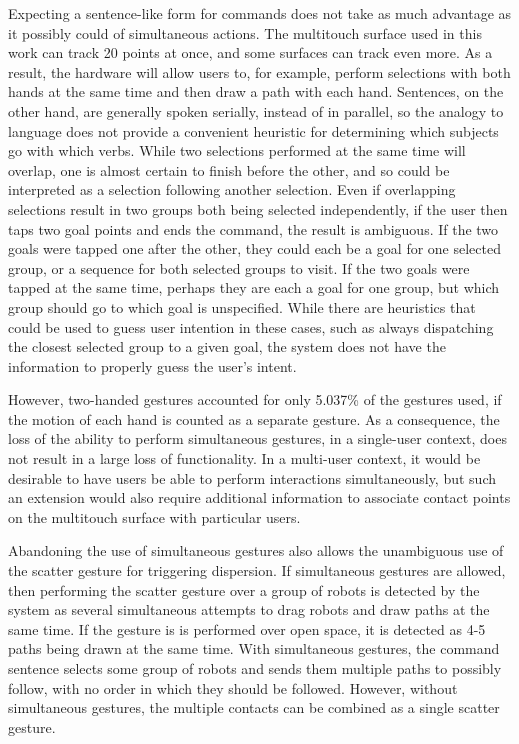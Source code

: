 Expecting a sentence-like form for commands does not take as much advantage as it possibly could of simultaneous actions. 
The multitouch surface used in this work can track 20 points at once, and some surfaces can track even more. 
As a result, the hardware will allow users to, for example, perform selections with both hands at the same time and then draw a path with each hand. 
Sentences, on the other hand, are generally spoken serially, instead of in parallel, so the analogy to language does not provide a convenient heuristic for determining which subjects go with which verbs.
While two selections performed at the same time will overlap, one is almost certain to finish before the other, and so could be interpreted as a selection following another selection. 
Even if overlapping selections result in two groups both being selected independently, if the user then taps two goal points and ends the command, the result is ambiguous. 
If the two goals were tapped one after the other, they could each be a goal for one selected group, or a sequence for both selected groups to visit.
If the two goals were tapped at the same time, perhaps they are each a goal for one group, but which group should go to which goal is unspecified.  
While there are heuristics that could be used to guess user intention in these cases, such as always dispatching the closest selected group to a given goal, the system does not have the information to properly guess the user's intent.

However, two-handed gestures accounted for only 5.037\% of the gestures used, if the motion of each hand is counted as a separate gesture. 
As a consequence, the loss of the ability to perform simultaneous gestures, in a single-user context, does not result in a large loss of functionality.
In a multi-user context, it would be desirable to have users be able to perform interactions simultaneously, but such an extension would also require additional information to associate contact points on the multitouch surface with particular users. 

Abandoning the use of simultaneous gestures also allows the unambiguous use of the scatter gesture for triggering dispersion. 
If simultaneous gestures are allowed, then performing the scatter gesture over a group of robots is detected by the system as several simultaneous attempts to drag robots and draw paths at the same time. 
If the gesture is is performed over open space, it is detected as 4-5 paths being drawn at the same time. 
With simultaneous gestures, the command sentence selects some group of robots and sends them multiple paths to possibly follow, with no order in which they should be followed. 
However, without simultaneous gestures, the multiple contacts can be combined as a single scatter gesture. 

